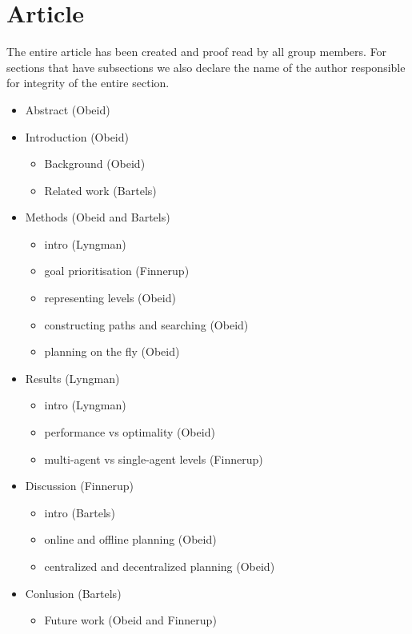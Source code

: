 \documentclass[a4paper]{article}
\newcommand{\jens}{Finnerup}
\newcommand{\sune}{Bartels}
\newcommand{\superdude}{Lyngman}
\newcommand{\elias}{Obeid}
\begin{document}
\section{Article}
The entire article has been created and proof read by all group members.
For sections that have subsections we also declare the name of the author responsible for integrity of the entire section.
\begin{itemize}
  \item Abstract (\elias)
  \item Introduction (\elias)
    \begin{itemize}
      \item Background (\elias)
      \item Related work (\sune)
    \end{itemize}
  \item Methods (\elias{} and \sune)
    \begin{itemize}
      \item intro (\superdude)
      \item goal prioritisation (\jens)
      \item representing levels (\elias)
      \item constructing paths and searching (\elias)
      \item planning on the fly (\elias)
    \end{itemize}
  \item Results (\superdude)
    \begin{itemize}
      \item intro (\superdude)
      \item performance vs optimality (\elias)
      \item multi-agent vs single-agent levels (\jens)
    \end{itemize}
  \item Discussion (\jens)
    \begin{itemize}
      \item intro (\sune)
      \item online and offline planning (\elias)
      \item centralized and decentralized planning (\elias)
    \end{itemize}
  \item Conlusion (\sune)
    \begin{itemize}
      \item Future work (\elias{} and \jens)
    \end{itemize}
\end{itemize}
\end{document}
